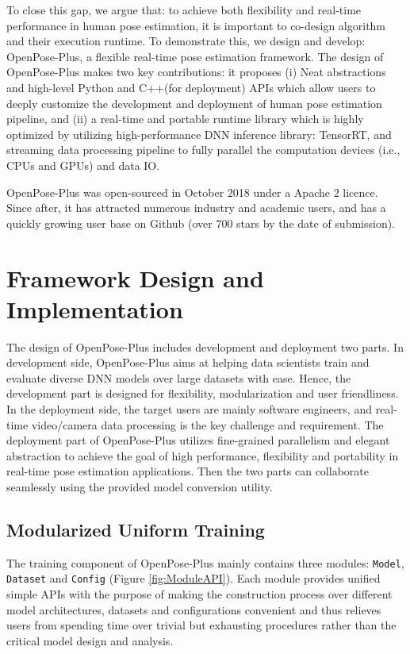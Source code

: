 \documentclass[twoside,11pt]{article}
\begin{document}
To close this gap, we argue that: to achieve both flexibility and real-time performance in human pose estimation, it is important to co-design algorithm and their execution runtime. To demonstrate this, we design and develop: OpenPose-Plus, a flexible real-time pose estimation framework. The design of OpenPose-Plus makes two key contributions: it proposes
(i) Neat abstractions and high-level Python and C++(for deployment) APIs which allow users to deeply customize the development and deployment of human pose estimation pipeline, and (ii) a real-time and portable runtime library which is highly optimized by utilizing high-performance DNN inference library: TensorRT, and streaming data processing pipeline to fully parallel the computation devices (i.e., CPUs and GPUs) and data IO.

OpenPose-Plus was open-sourced in October 2018 under a Apache 2 licence. Since after, it has attracted numerous industry and academic users, and has a quickly growing user base on Github (over 700 stars by the date of submission). 

\section{Framework Design and Implementation}

The design of OpenPose-Plus includes development and deployment two parts. In development side, OpenPose-Plus aims at helping data scientists train and evaluate diverse DNN models over large datasets with ease. Hence, the development part is designed for flexibility, modularization and user friendliness. In the deployment side, the target users are mainly software engineers, and real-time video/camera data processing is the key challenge and requirement. The deployment part of OpenPose-Plus utilizes fine-grained parallelism and elegant abstraction to achieve the goal of high performance, flexibility and portability in real-time pose estimation applications. Then the two parts can collaborate seamlessly using the provided model conversion utility.

\subsection{Modularized Uniform Training}

The training component of OpenPose-Plus mainly contains three modules: \texttt{Model}, \texttt{Dataset} and \texttt{Config} (Figure \ref{fig:ModuleAPI}). Each module provides unified simple APIs with the purpose of making the construction process over different model architectures, datasets and configurations convenient and thus relieves users from spending time over trivial but exhausting procedures rather than the critical model design and analysis.
\end{document}
